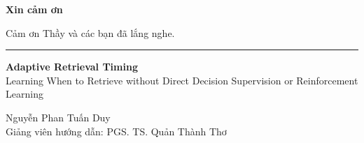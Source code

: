 \documentclass[aspectratio=169]{beamer}
\begin{document}
\begin{frame}[plain]

    \begin{center}

        \vspace*{2.2cm}

        {
        \fontsize{28}{34}\selectfont
        \textbf{Xin cảm ơn}}

        \vspace{0.6cm}

        {\large
        Cảm ơn Thầy và các bạn đã lắng nghe.
        }

        \vspace{1.2cm}

        \rule{0.45\textwidth}{0.5pt}

        \vspace{0.35cm}

        {\normalsize
        \textbf{Adaptive Retrieval Timing}\\
        Learning When to Retrieve without Direct Decision Supervision
        or Reinforcement Learning
        }

        \vspace{0.8cm}

        {\small
        Nguyễn Phan Tuấn Duy\\
        Giảng viên hướng dẫn: PGS. TS. Quản Thành Thơ
        }

    \end{center}

\end{frame}

\end{document}
